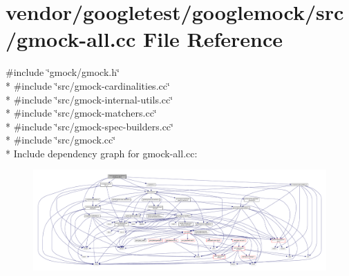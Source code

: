 \hypertarget{gmock-all_8cc}{}\section{vendor/googletest/googlemock/src/gmock-\/all.cc File Reference}
\label{gmock-all_8cc}
{\ttfamily \#include \char`\"{}gmock/gmock.\+h\char`\"{}}\\*
{\ttfamily \#include \char`\"{}src/gmock-\/cardinalities.\+cc\char`\"{}}\\*
{\ttfamily \#include \char`\"{}src/gmock-\/internal-\/utils.\+cc\char`\"{}}\\*
{\ttfamily \#include \char`\"{}src/gmock-\/matchers.\+cc\char`\"{}}\\*
{\ttfamily \#include \char`\"{}src/gmock-\/spec-\/builders.\+cc\char`\"{}}\\*
{\ttfamily \#include \char`\"{}src/gmock.\+cc\char`\"{}}\\*
Include dependency graph for gmock-\/all.cc\+:\nopagebreak
\begin{figure}[H]
\begin{center}
\leavevmode
\includegraphics[width=350pt]{gmock-all_8cc__incl}
\end{center}
\end{figure}
